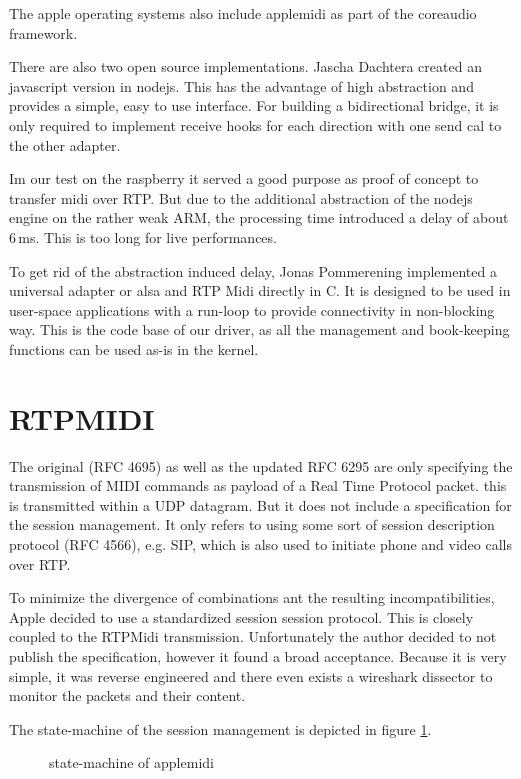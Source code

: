 \documentclass[paper=a4,fontsize=11pt,pagesize,bibtotoc]{scrartcl}
\begin{document}
	The apple operating systems also include applemidi as part of the coreaudio framework.
	
	There are also two open source implementations. 
	Jascha Dachtera created an javascript version in nodejs. This has the advantage of high abstraction and provides a simple, easy to use interface. For building a bidirectional bridge, it is only required to implement receive hooks for each direction with one send cal to the other adapter.
	
	Im our test on the raspberry it served a good purpose as proof of concept to transfer midi over RTP. But due to the additional abstraction of the nodejs engine on the rather weak ARM, the processing time introduced a delay of about 6\,ms. This is too long for live performances.
	
	To get rid of the abstraction induced delay, 
	 Jonas Pommerening 
	implemented a universal adapter or alsa and RTP Midi directly in C. It is designed to be used in user-space applications with a run-loop to provide connectivity in non-blocking way. This is the code base of our driver, as all the management and book-keeping functions can be used as-is in the kernel.
	
	\section{RTPMIDI}
	The original (RFC 4695) as well as the updated RFC 6295
	are only specifying the transmission of MIDI commands as payload of a Real Time Protocol packet. this is transmitted within a UDP datagram. But it does not include a specification for the session management. It only refers to using some sort of session description protocol
	(RFC 4566), e.g. SIP, which is also used to initiate phone and video calls over RTP.
	
	
	To minimize the divergence of combinations ant the resulting incompatibilities, Apple decided to use a standardized session session protocol. This is closely coupled to the RTPMidi transmission. Unfortunately the author decided to not publish the specification, however it found a broad acceptance. Because it is very simple, it was reverse engineered and there even exists a wireshark dissector to monitor the packets and their content.
	
	The state-machine of the session management is depicted in figure \ref{fig:state}.
	
	\begin{figure}
		\centering
		\begin{tikzpicture}
			
		\end{tikzpicture}
		\caption{state-machine of applemidi}
		\label{fig:state}
	\end{figure}
	
\end{document}
